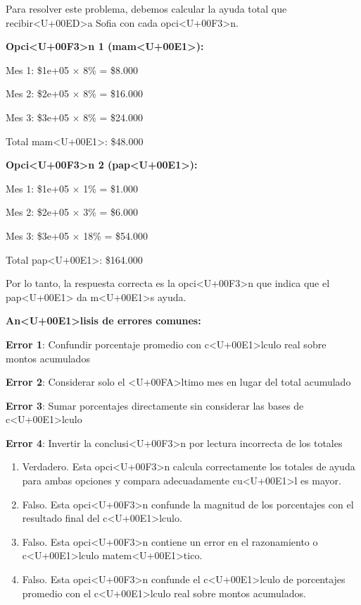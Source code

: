 \documentclass[10pt,a4paper]{article}
\newenvironment{solution}{\comment}{\endcomment}
\newenvironment{answerlist}{\renewcommand{\labelenumii}{(\alph{enumii})}\begin{enumerate}}{\end{enumerate}}
\begin{document}
\begin{enumerate}
\begin{solution}

Para resolver este problema, debemos calcular la ayuda total que recibir<U+00ED>a Sofia con cada opci<U+00F3>n.

\textbf{Opci<U+00F3>n 1 (mam<U+00E1>):}

Mes 1: \$1e+05 $\times$ 8\% = \$8.000

Mes 2: \$2e+05 $\times$ 8\% = \$16.000

Mes 3: \$3e+05 $\times$ 8\% = \$24.000

Total mam<U+00E1>: \$48.000

\textbf{Opci<U+00F3>n 2 (pap<U+00E1>):}

Mes 1: \$1e+05 $\times$ 1\% = \$1.000

Mes 2: \$2e+05 $\times$ 3\% = \$6.000

Mes 3: \$3e+05 $\times$ 18\% = \$54.000

Total pap<U+00E1>: \$164.000

Por lo tanto, la respuesta correcta es la opci<U+00F3>n que indica que el pap<U+00E1> da m<U+00E1>s ayuda.

\textbf{An<U+00E1>lisis de errores comunes:}

\textbf{Error 1}: Confundir porcentaje promedio con c<U+00E1>lculo real sobre montos acumulados

\textbf{Error 2}: Considerar solo el <U+00FA>ltimo mes en lugar del total acumulado

\textbf{Error 3}: Sumar porcentajes directamente sin considerar las bases de c<U+00E1>lculo

\textbf{Error 4}: Invertir la conclusi<U+00F3>n por lectura incorrecta de los totales

\begin{answerlist}
  \item Verdadero. Esta opci<U+00F3>n calcula correctamente los totales de ayuda para ambas opciones y compara adecuadamente cu<U+00E1>l es mayor.
  \item Falso. Esta opci<U+00F3>n confunde la magnitud de los porcentajes con el resultado final del c<U+00E1>lculo.
  \item Falso. Esta opci<U+00F3>n contiene un error en el razonamiento o c<U+00E1>lculo matem<U+00E1>tico.
  \item Falso. Esta opci<U+00F3>n confunde el c<U+00E1>lculo de porcentajes promedio con el c<U+00E1>lculo real sobre montos acumulados.
\end{answerlist}
\end{solution}

\end{enumerate}
\end{document}
